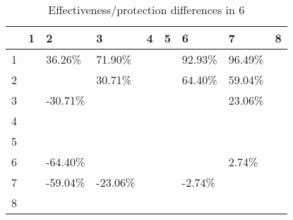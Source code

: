 \begin{table}[ht]
\centering
\begin{tabular}{rllllllll}
  \hline
 & 1 & 2 & 3 & 4 & 5 & 6 & 7 & 8 \\ 
  \hline
1 &  & 36.26\% & 71.90\% &  &  & 92.93\% & 96.49\% &  \\ 
  2 &  &  & 30.71\% &  &  & 64.40\% & 59.04\% &  \\ 
  3 &  & -30.71\% &  &  &  &  & 23.06\% &  \\ 
  4 &  &  &  &  &  &  &  &  \\ 
  5 &  &  &  &  &  &  &  &  \\ 
  6 &  & -64.40\% &  &  &  &  & 2.74\% &  \\ 
  7 &  & -59.04\% & -23.06\% &  &  & -2.74\% &  &  \\ 
  8 &  &  &  &  &  &  &  &  \\ 
   \hline
\end{tabular}
\caption{Effectiveness/protection differences in  6} 
\end{table}
